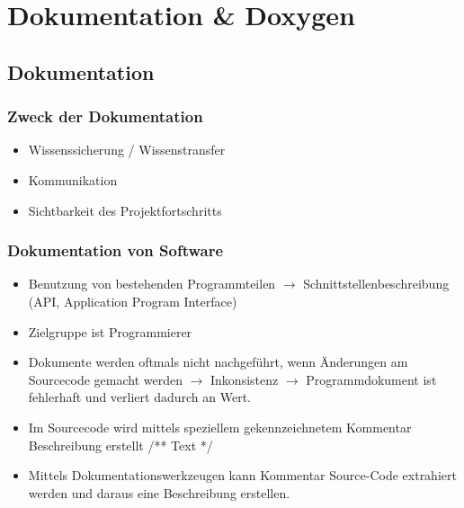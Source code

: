 \section{Dokumentation \& Doxygen}
\subsection{Dokumentation}
\subsubsection{Zweck der Dokumentation}
\begin{itemize}
	\item Wissenssicherung / Wissenstransfer
	\item Kommunikation
	\item Sichtbarkeit des Projektfortschritts
\end{itemize}
\subsubsection{Dokumentation von Software}
\begin{minipage}{\linewidth}
\begin{itemize}
	\item Benutzung von bestehenden Programmteilen \newline $\rightarrow$ Schnittstellenbeschreibung (API, Application Program Interface)
	\item Zielgruppe ist Programmierer
	\item Dokumente werden oftmals nicht nachgeführt, wenn Änderungen am Sourcecode gemacht werden $\rightarrow$ Inkonsistenz \newline $\rightarrow$ Programmdokument ist fehlerhaft und verliert dadurch an Wert.
	\item Im Sourcecode wird mittels speziellem gekennzeichnetem Kommentar Beschreibung erstellt /** Text */
	\item Mittels Dokumentationswerkzeugen kann Kommentar Source-Code extrahiert werden und daraus eine Beschreibung erstellen.  
\end{itemize}
\end{minipage}
